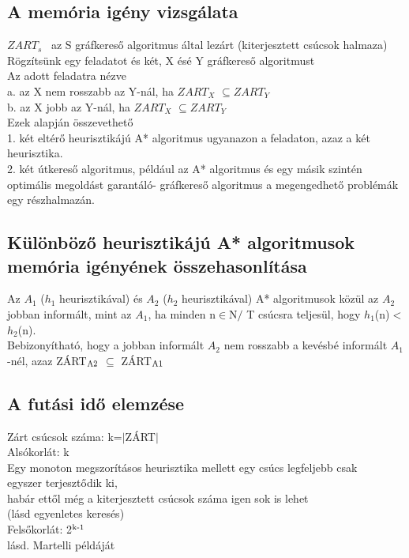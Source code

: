 \documentclass{article}
\begin{document}
	 \subsection{A memória igény vizsgálata}
	 $ZART_s$ ~az S gráfkereső algoritmus által lezárt (kiterjesztett csúcsok halmaza)\\
	 Rögzítsünk egy feladatot és két, X ésé Y gráfkereső algoritmust\\
	 Az adott feladatra nézve\\
	 a. az X nem rosszabb az Y-nál, ha $ZART_X$ $\subseteq$$ZART_Y$\\
	 b. az X jobb az Y-nál, ha $ZART_X$ $\subseteq$$ZART_Y$ \\
	 Ezek alapján összevethető\\
	 1. két eltérő heurisztikájú A* algoritmus ugyanazon a feladaton, azaz a két heurisztika.\\
	 2. két útkereső algoritmus, például az A* algoritmus és egy másik szintén optimális megoldást garantáló- gráfkereső algoritmus a megengedhető problémák egy részhalmazán.\\
	 
	 \subsection{Különböző heurisztikájú A* algoritmusok memória igényének összehasonlítása}
	 Az $A_1$ ($h_1$ heurisztikával) és $A_2$ ($h_2$ heurisztikával) A* algoritmusok közül az $A_2$ jobban informált, mint az $A_1$, ha minden n$\in$N$/$ T csúcsra teljesül, hogy $h_1$(n)$<$$h_2$(n).\\
	 Bebizonyítható, hogy a jobban informált $A_2$ nem rosszabb a kevésbé informált $A_1$-nél, azaz ZÁRT$\textsubscript{A2}$ $\subseteq$ ZÁRT$\textsubscript{A1}$
	 
	 \subsection{A futási idő elemzése}
	 Zárt csúcsok száma: k=$|$ZÁRT$|$\\
	 Alsókorlát: k\\
	 \hspace*{1em} Egy monoton megszorításos heurisztika mellett egy csúcs legfeljebb csak\\
	 \hspace*{1em} egyszer terjesztődik ki,\\
	 \hspace*{1em} habár ettől még a kiterjesztett csúcsok száma igen sok is lehet\\
	 \hspace*{1em} (lásd egyenletes keresés)\\
	 Felsőkorlát: 2$\textsuperscript{k-1}$\\
	 \hspace*{1em} lásd. Martelli példáját
	 
\end{document}
